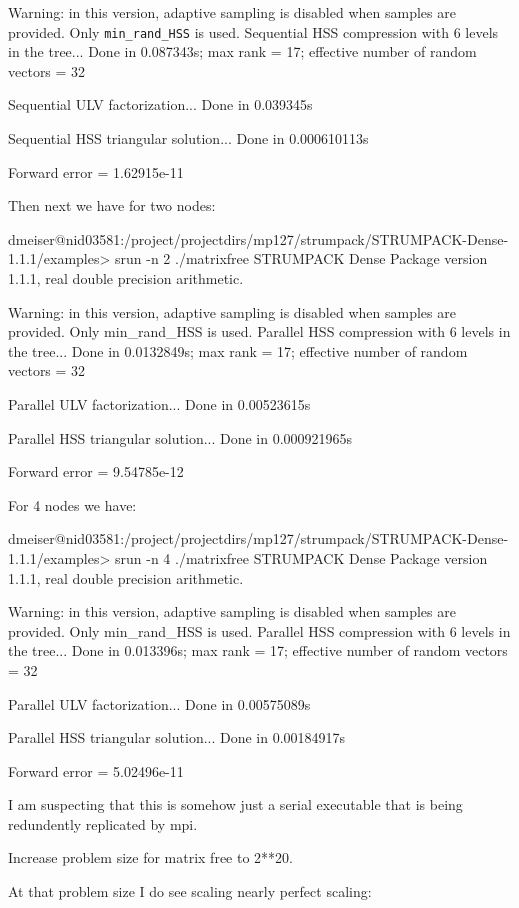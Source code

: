 \documentclass{acmsmall}
\begin{document}
Warning: in this version, adaptive sampling is disabled when samples are
provided. Only \verb!min_rand_HSS! is used.
Sequential HSS compression with 6 levels in the tree...
Done in 0.087343s; max rank = 17; effective number of random vectors =
32

Sequential ULV factorization...
Done in 0.039345s

Sequential HSS triangular solution...
Done in 0.000610113s

Forward error = 1.62915e-11



Then next we have for two nodes:

dmeiser@nid03581:/project/projectdirs/mp127/strumpack/STRUMPACK-Dense-1.1.1/examples>
srun -n 2 ./matrixfree
STRUMPACK Dense Package version 1.1.1, real double precision arithmetic.

Warning: in this version, adaptive sampling is disabled when samples are
provided. Only min_rand_HSS is used.
Parallel HSS compression with 6 levels in the tree...
Done in 0.0132849s; max rank = 17; effective number of random vectors =
32

Parallel ULV factorization...
Done in 0.00523615s

Parallel HSS triangular solution...
Done in 0.000921965s

Forward error = 9.54785e-12


For 4 nodes we have:


dmeiser@nid03581:/project/projectdirs/mp127/strumpack/STRUMPACK-Dense-1.1.1/examples>
srun -n 4 ./matrixfree
STRUMPACK Dense Package version 1.1.1, real double precision arithmetic.

Warning: in this version, adaptive sampling is disabled when samples are
provided. Only min_rand_HSS is used.
Parallel HSS compression with 6 levels in the tree...
Done in 0.013396s; max rank = 17; effective number of random vectors =
32

Parallel ULV factorization...
Done in 0.00575089s

Parallel HSS triangular solution...
Done in 0.00184917s

Forward error = 5.02496e-11


I am suspecting that this is somehow just a serial executable that is
being redundently replicated by mpi.



Increase problem size for matrix free to 2**20.

At that problem size I do see scaling nearly perfect scaling:
\end{document}
